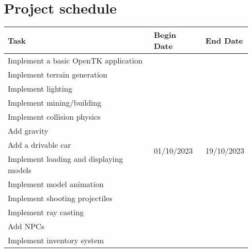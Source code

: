 \documentclass[12pt]{article}
\begin{document}
\section{Project schedule} %

\begin{table}[H]
    \begin{tabular}{lll}
        \hline
        \textbf{Task}                                       & \textbf{Begin Date}          & \textbf{End Date}            \\ \hline
        Implement a basic OpenTK application                & \multirow{16}{*}{01/10/2023} & \multirow{16}{*}{19/10/2023} \\
        Implement terrain generation                        &                              &                              \\
        Implement lighting                                  &                              &                              \\
        Implement mining/building                           &                              &                              \\
        Implement collision physics                         &                              &                              \\
        Add gravity                                         &                              &                              \\
        Add a drivable car                                  &                              &                              \\
        Implement loading and displaying models             &                              &                              \\
        Implement model animation                           &                              &                              \\
        Implement shooting projectiles                      &                              &                              \\
        Implement ray casting                               &                              &                              \\
        Add NPCs                                            &                              &                              \\
        Implement inventory system                          &                              &                              \\

\end{tabular}
\end{table}
\end{document}
